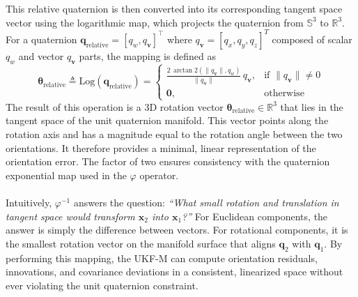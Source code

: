 \\ \\
This relative quaternion is then converted into its corresponding tangent space vector using the logarithmic map, which projects the quaternion from $\mathbb{S}^3$ to $\mathbb{R}^3$. For a quaternion $\mathbf{q}_{\text{relative}} = [q_w, q_{\mathbf{v}}]^\top$ where $q_{\mathbf{v}} = [q_x, q_y, q_z]^T$ composed of scalar $q_w$ and vector $q_{\mathbf{v}}$ parts, the mapping is defined as
$$
    \boldsymbol{\theta}_{\text{relative}} \triangleq
    \mathrm{Log}(\mathbf{q}_{\text{relative}}) =
    \begin{cases}
        \displaystyle \frac{2 \, \arctan2(\|q_{\mathbf{v}}\|, q_w)}{\|q_{\mathbf{v}}\|}\,q_{\mathbf{v}}, & \text{if } \|q_{\mathbf{v}}\| \neq 0 \\[1em]
        \mathbf{0}, & \text{otherwise}
    \end{cases}
$$
The result of this operation is a 3D rotation vector $\boldsymbol{\theta}_{\text{relative}} \in \mathbb{R}^3$ that lies in the tangent space of the unit quaternion manifold. This vector points along the rotation axis and has a magnitude equal to the rotation angle between the two orientations. It therefore provides a minimal, linear representation of the orientation error. The factor of two ensures consistency with the quaternion exponential map used in the $\varphi$ operator.
\\ \\
Intuitively, $\varphi^{-1}$ answers the question: \textit{``What small rotation and translation in tangent space would transform $\mathbf{x}_2$ into $\mathbf{x}_1$?''} For Euclidean components, the answer is simply the difference between vectors. For rotational components, it is the smallest rotation vector on the manifold surface that aligns $\mathbf{q}_2$ with $\mathbf{q}_1$. By performing this mapping, the UKF-M can compute orientation residuals, innovations, and covariance deviations in a consistent, linearized space without ever violating the unit quaternion constraint.

